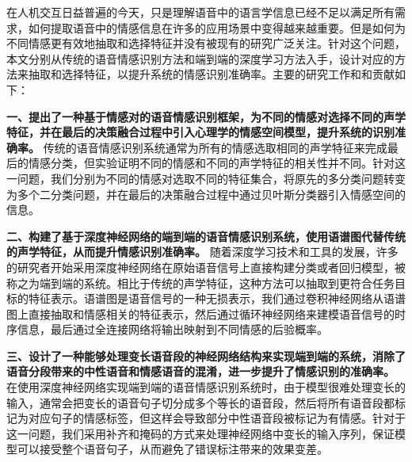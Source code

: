 \begin{cabstract}
  在人机交互日益普遍的今天，只是理解语音中的语言学信息已经不足以满足所有需求，如何提取语音中的情感信息在许多的应用场景中变得越来越重要。但是如何为不同情感更有效地抽取和选择特征并没有被现有的研究广泛关注。针对这个问题，本文分别从传统的语音情感识别方法和端到端的深度学习方法入手，设计对应的方法来抽取和选择特征，以提升系统的情感识别准确率。主要的研究工作和和贡献如下：

 
\textbf{一、提出了一种基于情感对的语音情感识别框架，为不同的情感对选择不同的声学特征，并在最后的决策融合过程中引入心理学的情感空间模型，提升系统的识别准确率。} 传统的语音情感识别系统通常为所有的情感选取相同的声学特征来完成最后的情感分类，但实验证明不同的情感和不同的声学特征的相关性并不同。针对这一问题，我们分别为不同的情感对选取不同的特征集合，将原先的多分类问题转变为多个二分类问题，并在最后的决策融合过程中通过贝叶斯分类器引入情感空间的信息。

\textbf{二、构建了基于深度神经网络的端到端的语音情感识别系统，使用语谱图代替传统的声学特征，从而提升情感识别准确率。} 随着深度学习技术和工具的发展，许多的研究者开始采用深度神经网络在原始语音信号上直接构建分类或者回归模型，被称之为端到端的系统。相比于传统的声学特征，这种方法可以抽取到更符合任务目标的特征表示。语谱图是语音信号的一种无损表示，我们通过卷积神经网络从语谱图上直接抽取和情感相关的特征表示，然后通过循环神经网络来建模语音信号的时序信息，最后通过全连接网络将输出映射到不同情感的后验概率。

\textbf{三、设计了一种能够处理变长语音段的神经网络结构来实现端到端的系统，消除了语音分段带来的中性语音和情感语音的混淆，进一步提升了情感识别的准确率。} 在使用深度神经网络实现端到端的语音情感识别系统时，由于模型很难处理变长的输入，通常会把变长的语音句子切分成多个等长的语音段，然后将所有语音段都标记为对应句子的情感标签，但这样会导致部分中性语音段被标记为有情感。针对于这一问题，我们采用补齐和掩码的方式来处理神经网络中变长的输入序列，保证模型可以接受整个语音句子，从而避免了错误标注带来的效果变差。
 
\end{cabstract}

